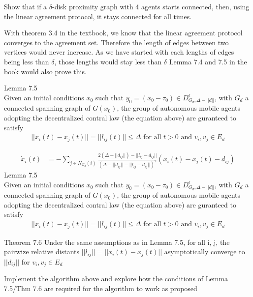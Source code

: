\documentclass{article}
\begin{document}
\newpage
\begin{problem}
Show that if a $\delta$-disk proximity graph with 4 agents starts connected, then, using the linear agreement protocol, it stays connected for all times.

With theorem 3.4  in the textbook, we know that the linear agreement protocol converges to the agreement set. Therefore the length of edges between two vertices would never increase. As we have started with each lengths of edges being less than $\delta$, those lengths would stay less than $\delta$
Lemma 7.4 and 7.5 in the book would also prove this.

Lemma 7.5\\
    Given an initial conditions $x_0$ such that $y_0 = (x_0 - \tau_0) \in D_{G_{d}, \Delta -||d||}^\epsilon$, with $G_d$ a connected spanning graph of $G(x_0)$, the group of autonomous mobile agents adopting the decentralized contral law (the equation above) are guranteed to satisfy
    \begin{align*}
        ||x_i(t) - x_j(t)|| = ||l_{ij}(t)|| \leq \Delta \text{ for all } t > 0 \text{ and }{ v_i, v_j} \in E_d
    \end{align*}
\end{problem}
\begin{problem}
    \begin{align*}
        \dot x_i(t) &= -\sum_{j \in N_{G_d}(i)} \frac{2(\Delta - ||d_{ij}||) - ||l_{ij} - d_{ij}||}{(\Delta - ||d_{ij}|| - ||l_{ij} - d_{ij}||)^2} (x_i(t) - x_j(t) - d_{ij} )
    \end{align*}
    Lemma 7.5\\
    Given an initial conditions $x_0$ such that $y_0 = (x_0 - \tau_0) \in D_{G_{d}, \Delta -||d||}^\epsilon$, with $G_d$ a connected spanning graph of $G(x_0)$, the group of autonomous mobile agents adopting the decentralized contral law (the equation above) are guranteed to satisfy
    \begin{align*}
        ||x_i(t) - x_j(t)|| = ||l_{ij}(t)|| \leq \Delta \text{ for all } t > 0 \text{ and }{ v_i, v_j} \in E_d
    \end{align*}

    Theorem 7.6
    Under the same assumptions as in Lemma 7.5, for all i, j, the pairwize relative distants $||l_{ij}|| = ||x_i(t) - x_j(t)||$ asymptotically converge to $||d_{ij}||$ for ${v_i, v_j} \in E_d$
    
    \vspace{12pt}
    Implement the algorithm above and explore how the conditions of Lemma 7.5/Thm 7.6 are required for the algorithm to work as proposed    
\end{problem}
    
\end{document}
